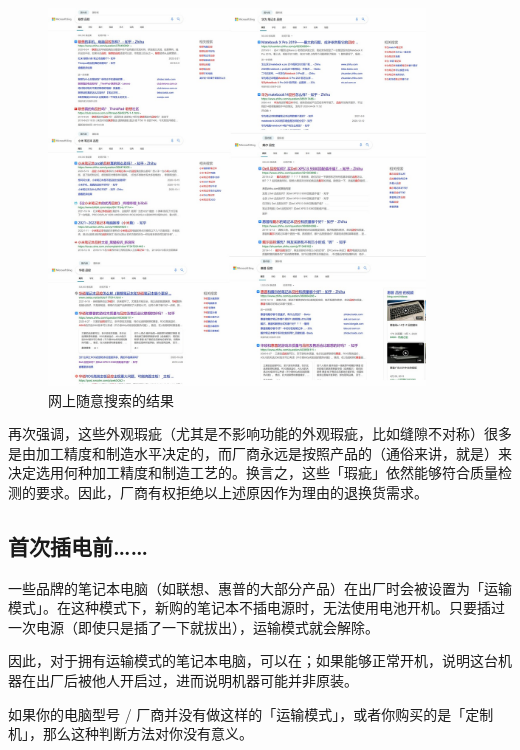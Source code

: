 \begin{figure}[htb!]
  \centering
  \includegraphics[width=10cm]{assets/Quality_Discuss.jpg}
  \caption{网上随意搜索的结果}
  \label{quality-discuss}
\end{figure}

再次强调，这些外观瑕疵（尤其是不影响功能的外观瑕疵，比如缝隙不对称）很多是由加工精度和制造水平决定的，而厂商永远是按照产品的（通俗来讲，就是）来决定选用何种加工精度和制造工艺的。换言之，这些「瑕疵」依然能够符合质量检测的要求。因此，厂商有权拒绝以上述原因作为理由的退换货需求。

\subsection{首次插电前……}

一些品牌的笔记本电脑（如联想、惠普的大部分产品）在出厂时会被设置为「运输模式」。在这种模式下，新购的笔记本不插电源时，无法使用电池开机。只要插过一次电源（即使只是插了一下就拔出），运输模式就会解除。

因此，对于拥有运输模式的笔记本电脑，可以在；如果能够正常开机，说明这台机器在出厂后被他人开启过，进而说明机器可能并非原装。

\begin{note}
  如果你的电脑型号 / 厂商并没有做这样的「运输模式」，或者你购买的是「定制机」，那么这种判断方法对你没有意义。
\end{note}

